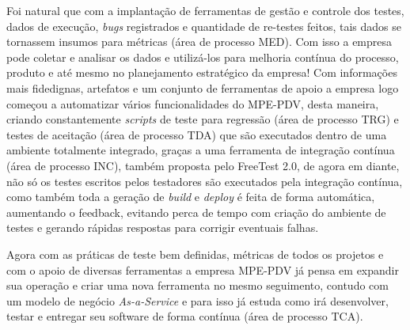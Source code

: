 Foi natural que com a implantação de ferramentas de gestão e controle dos testes, dados de execução, \textit{bugs} registrados e quantidade de re-testes feitos, tais dados se tornassem insumos para métricas (área de processo MED). Com isso a empresa pode coletar e analisar os dados e utilizá-los para melhoria contínua do processo, produto e até mesmo no planejamento estratégico da empresa! Com informações mais fidedignas, artefatos e um conjunto de ferramentas de apoio a empresa logo começou a automatizar vários funcionalidades do MPE-PDV, desta maneira, criando constantemente \textit{scripts} de teste para regressão (área de processo TRG) e testes de aceitação (área de processo TDA) que são executados dentro de uma ambiente totalmente integrado, graças a uma ferramenta de integração contínua (área de processo INC), também proposta pelo FreeTest 2.0, de agora em diante, não só os testes escritos pelos testadores são executados pela integração contínua, como também toda a geração de \textit{build} e \textit{deploy} é feita de forma automática, aumentando o feedback, evitando perca de tempo com criação do ambiente de testes e gerando rápidas respostas para corrigir eventuais falhas.

Agora com as práticas de teste bem definidas, métricas de todos os projetos e com o apoio de diversas ferramentas a empresa MPE-PDV já pensa em expandir sua operação e criar uma nova ferramenta no mesmo seguimento, contudo com um modelo de negócio \textit{As-a-Service} e para isso já estuda como irá desenvolver, testar e entregar seu software de forma contínua (área de processo TCA).